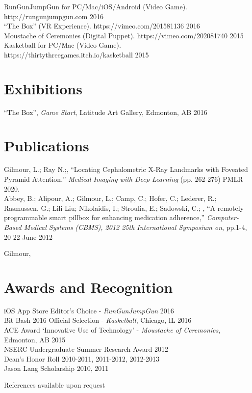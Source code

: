 \documentclass[10pt]{article}
\begin{document}
RunGunJumpGun for PC/Mac/iOS/Android (Video Game). http://rungunjumpgun.com \hfill 2016 \\

``The Box'' (VR Experience). https://vimeo.com/201581136 \hfill 2016 \\

Moustache of Ceremonies (Digital Puppet). https://vimeo.com/202081740 \hfill 2015 \\

Kasketball for PC/Mac (Video Game). https://thirtythreegames.itch.io/kasketball \hfill 2015 \\

\section*{Exhibitions}
``The Box'', \emph{Game Start}, Latitude Art Gallery, Edmonton, AB \hfill 2016 \\
\section*{Publications}
Gilmour, L.; Ray N.;, ``Locating Cephalometric X-Ray Landmarks with Foveated Pyramid Attention,'' \emph{Medical Imaging with Deep Learning} (pp. 262-276) PMLR 2020.\\

Abbey, B.; Alipour, A.; Gilmour, L.; Camp, C.; Hofer, C.; Lederer, R.; Rasmussen, G.; Lili Liu; Nikolaidis, I.; Stroulia, E.; Sadowski, C.; , ``A remotely programmable smart pillbox for enhancing medication adherence,'' \emph{Computer-Based Medical Systems (CBMS), 2012 25th International Symposium on}, pp.1-4, 20-22 June 2012



Gilmour,

\section*{Awards and Recognition}

\noindent iOS App Store Editor's Choice - \emph{RunGunJumpGun} \hfill 2016 \\

\noindent Bit Bash 2016 Official Selection - \emph{Kasketball}, Chicago, IL \hfill 2016 \\

\noindent ACE Award ‘Innovative Use of Technology’ - \emph{Moustache of Ceremonies}, Edmonton, AB \hfill 2015 \\

\noindent NSERC Undergraduate Summer Research Award \hfill 2012 \\

\noindent Dean's Honor Roll \hfill 2010-2011, 2011-2012, 2012-2013 \\

\noindent Jason Lang Scholarship \hfill 2010, 2011 \\

\vspace{\baselineskip}

\noindent References available upon request
\end{document}
